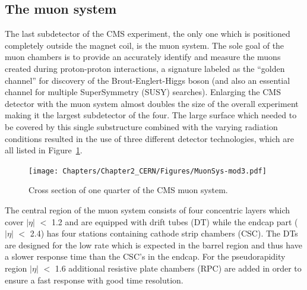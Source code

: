 \subsection{The muon system}\label{sec::MuonChamber}

The last subdetector of the CMS experiment, the only one which is positioned completely outside the magnet coil, is the muon system. The sole goal of the muon chambers is to provide an accurately identify and measure the muons created during proton-proton interactions, a signature labeled as the ``golden channel'' for discovery of the Brout-Englert-Higgs boson (and also an essential channel for multiple SuperSymmetry (SUSY) searches). 
Enlarging the CMS detector with the muon system almost doubles the size of the overall experiment making it the largest subdetector of the four. 
The large surface which needed to be covered by this single substructure combined with the varying radiation conditions resulted in the use of three different detector technologies, which are all listed in Figure~\ref{fig::MuonAndCMS}.
\begin{figure}[h!t]
 \centering
 \texttt{[image: Chapters/Chapter2\_CERN/Figures/MuonSys-mod3.pdf]}
 \caption{Cross section of one quarter of the CMS muon system.} \label{fig::MuonAndCMS}
\end{figure}

The central region of the muon system consists of four concentric layers which cover $\vert \eta \vert$ $<$ 1.2 and are equipped with drift tubes (DT) while the endcap part ($\vert \eta \vert$ $<$ 2.4) has four stations containing cathode strip chambers (CSC). The DTs are designed for the low rate which is expected in the barrel region and thus have a slower response time than the CSC's in the endcap. For the pseudorapidity region $\vert \eta \vert$ $<$ 1.6 additional resistive plate chambers (RPC) are added in order to ensure a fast response with good time resolution.

